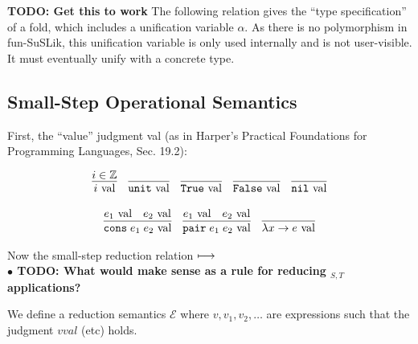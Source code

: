 \documentclass[10pt]{article}
\begin{document}
\textbf{TODO: Get this to work}
\noindent
The following relation gives the ``type specification'' of a fold, which includes a unification variable $\alpha$. As there is no
polymorphism in fun-SuSLik, this unification variable is only used internally and is not user-visible. It must eventually
unify with a concrete type.



%

\subsection{Small-Step Operational Semantics}

First, the ``value'' judgment val (as in Harper's Practical Foundations for Programming Languages, Sec. 19.2):

\[
  \begin{array}{cc}
    \infer{i \val}{i \in \mathbb{Z}}
    ~~~
    \infer{\unit \val}{}
    ~~~
    \infer{\True \val}{}
    ~~~
    \infer{\False \val}{}
    ~~~
    \infer{\nil \val}{}
    \\\\
    \infer{\cons\; e_1\; e_2 \val}{e_1 \val & e_2 \val}
    ~~~
    \infer{\pair\; e_1\; e_2 \val}{e_1 \val & e_2 \val}
    ~~~
    \infer{\lambda x \ra e \val}{}
  \end{array}
\]

\noindent
Now the small-step reduction relation $\longmapsto$\\

\textbf{$\bullet$ TODO: What would make sense as a rule for reducing $_{S,T}$ applications?}

We define a reduction semantics $\mathcal{E}$ where $v, v_1, v_2, \dots$ are expressions such that the judgment $v val$ (etc) holds.
\end{document}
